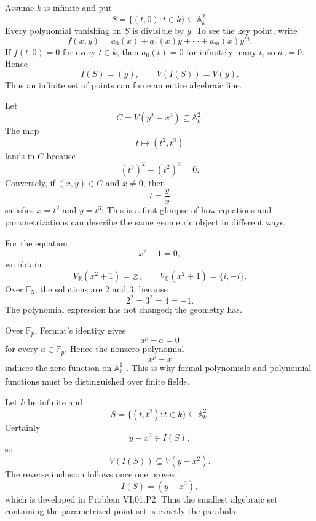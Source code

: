 \begin{example}
Assume \(k\) is infinite and put
\[
  S=\{(t,0):t\in k\}\subseteq\mathbb A_k^2.
\]
Every polynomial vanishing on \(S\) is divisible by \(y\).  To see the key point, write
\[
  f(x,y)=a_0(x)+a_1(x)y+\cdots+a_m(x)y^m.
\]
If \(f(t,0)=0\) for every \(t\in k\), then \(a_0(t)=0\) for infinitely many \(t\), so
\(a_0=0\).  Hence
\[
  I(S)=(y),
  \qquad
  V(I(S))=V(y).
\]
Thus an infinite set of points can force an entire algebraic line.
\end{example}

\begin{example}
Let
\[
  C=V(y^2-x^3)\subseteq\mathbb A_k^2.
\]
The map
\[
  t\longmapsto(t^2,t^3)
\]
lands in \(C\) because
\[
  (t^3)^2-(t^2)^3=0.
\]
Conversely, if \((x,y)\in C\) and \(x\neq0\), then
\[
  t=\frac yx
\]
satisfies \(x=t^2\) and \(y=t^3\).  This is a first glimpse of how equations and
parametrizations can describe the same geometric object in different ways.
\end{example}

\begin{example}
For the equation
\[
  x^2+1=0,
\]
we obtain
\[
  V_{\mathbb R}(x^2+1)=\varnothing,
  \qquad
  V_{\mathbb C}(x^2+1)=\{i,-i\}.
\]
Over \(\mathbb F_5\), the solutions are \(2\) and \(3\), because
\[
  2^2=3^2=4=-1.
\]
The polynomial expression has not changed; the geometry has.
\end{example}

\begin{example}
Over \(\mathbb F_p\), Fermat's identity gives
\[
  a^p-a=0
\]
for every \(a\in\mathbb F_p\).  Hence the nonzero polynomial
\[
  x^p-x
\]
induces the zero function on \(\mathbb A_{\mathbb F_p}^1\).  This is why formal
polynomials and polynomial functions must be distinguished over finite fields.
\end{example}

\begin{example}
Let \(k\) be infinite and
\[
  S=\{(t,t^2):t\in k\}\subseteq\mathbb A_k^2.
\]
Certainly
\[
  y-x^2\in I(S),
\]
so
\[
  V(I(S))\subseteq V(y-x^2).
\]
The reverse inclusion follows once one proves
\[
  I(S)=(y-x^2),
\]
which is developed in Problem VI.01.P2.  Thus the smallest algebraic set containing the
parametrized point set is exactly the parabola.
\end{example}

